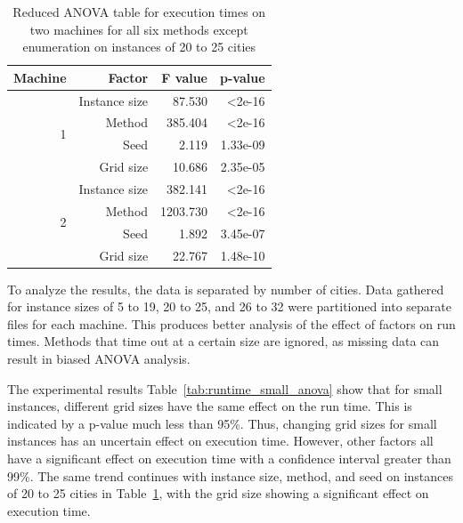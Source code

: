 \documentclass[11pt]{article}
\begin{document}
\begin{table}
	\centering
	\begin{tabular}{r|r|rr}
		Machine & Factor & F value & p-value  \\
		\hline
		\hline
		\multirow{4}{*}{1} 
		& Instance size             & 87.530 & \textless 2e-16 \\
		& Method             & 385.404 & \textless 2e-16 \\
		\cline{2-4}
		& Seed            & 2.119 & 1.33e-09 \\
		& Grid size & 10.686 & 2.35e-05 \\
		\hline
		\multirow{4}{*}{2}
		& Instance size             & 382.141 & \textless 2e-16 \\
		& Method             & 1203.730 & \textless 2e-16 \\
		\cline{2-4}
		& Seed            &  1.892 & 3.45e-07\\
		& Grid size & 22.767 & 1.48e-10 \\
	\end{tabular}
	\caption{Reduced ANOVA table for execution times on two machines for all six methods except enumeration on instances of 20 to 25 cities}
	\label{tab:runtime_medium_anova}
\end{table}
	To analyze the results, the data is separated by number of cities. Data gathered for instance sizes of 5 to 19, 20 to 25, and 26 to 32 were partitioned into separate files for each machine. This  produces better analysis of the effect of factors on run times. Methods that time out at a certain size are ignored, as missing data can result in biased ANOVA analysis. 
	
	The experimental results Table~\ref{tab:runtime_small_anova} show that for small instances, different grid sizes have the same effect on the run time. This is indicated by a p-value much less than 95\%. Thus, changing grid sizes for small instances has an uncertain effect on execution time. However, other factors all have a significant effect on execution time with a confidence interval greater than 99\%. The same trend continues with instance size, method, and seed on instances of 20 to 25 cities in Table~\ref{tab:runtime_medium_anova}, with the grid size showing a significant effect on execution time. 

	
	
	
\end{document}
